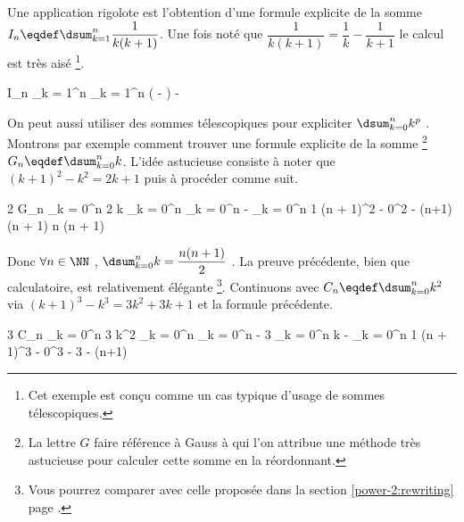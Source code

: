 Une application rigolote est l'obtention d'une formule explicite de la somme $I_n \eqdef \dsum_{k = 1}^{n} \dfrac{1}{k(k+1)}$. 
Une fois noté que $\dfrac{1}{k(k+1)} = \dfrac{1}{k} -  \dfrac{1}{k+1}$
le calcul est très aisé
\footnote{
	Cet exemple est conçu comme un cas typique d'usage de sommes télescopiques.
}.

\medskip

\begin{explain}[style = sar]
	I_n \explnext[\eqdef]{}
	\dsum_{k = 1}^{n} 
		\explnext{}
	\dsum_{k = 1}^{n} \left(  -  \right)
	 - 
		\explnext{}
\end{explain}


\bigskip

On peut aussi utiliser des sommes télescopiques pour expliciter $\dsum_{k = 0}^{n} k^p$ .
Montrons par exemple comment trouver une formule explicite de la somme
\footnote{
	La lettre $G$ faire référence à Gauss à qui l'on attribue une méthode très astucieuse pour calculer cette somme en la réordonnant.
}
$G_n \eqdef \dsum_{k = 0}^{n} k$.
L'idée astucieuse consiste à noter que $(k+1)^2 - k^2 = 2 k + 1$ puis à procéder comme suit.

\medskip

\begin{explain}[style = sar]
	2 G_n
		\explnext{}
	\dsum_{k = 0}^{n} 2 k
		\explnext{}
	\dsum_{k = 0}^{n} \big[ \, (k+1)^2 - k^2 - 1 \, \big]
		\explnext{}
	\dsum_{k = 0}^{n} \big[ \, (k+1)^2 - k^2 \, \big] - \dsum_{k = 0}^{n} 1
	(n + 1)^2 - 0^2 - (n+1)
		\explnext{}
	(n + 1) \cdot \big[ \, (n + 1) - 1 \, \big]
		\explnext{}
	n (n + 1)
\end{explain}

\bigskip

Donc
$\forall n \in \NN$ , $\dsum_{k = 0}^{n} k = \dfrac{n(n + 1)}{2}$ .
La preuve précédente, bien que calculatoire, est relativement élégante
\footnote{
	Vous pourrez comparer avec celle proposée dans la section \ref{power-2:rewriting} page \pageref{power-2:rewriting}.
}.
Continuons avec $C_n \eqdef \dsum_{k = 0}^{n} k^2$
via $(k+1)^3 - k^3 = 3 k^2 + 3 k + 1$
et la formule précédente.

\medskip

\begin{explain}[style = sar]
	3 C_n
		\explnext{}
	\dsum_{k = 0}^{n} 3 k^2
		\explnext{}
	\dsum_{k = 0}^{n} \big[ \, (k+1)^3 - k^3 - 3 k - 1 \, \big]
		\explnext{}
	\dsum_{k = 0}^{n} \big[ \, (k+1)^3 - k^3 \, \big] - 3 \dsum_{k = 0}^{n} k - \dsum_{k = 0}^{n} 1
	(n + 1)^3 - 0^3 - 3 \cdot {} - (n+1)
		\explnext{}
	 \cdot \big[ \, 2 (n + 1)^2 - 3n - 2 \, \big]
		\explnext{}
	 \cdot \big[ \, 2 (n^2 + 2 n + 1) - 3n - 2 \, \big]
		\explnext{}
		\explnext{}
\end{explain}


